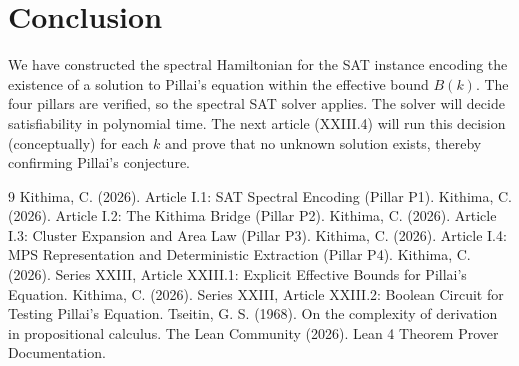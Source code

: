 \documentclass[11pt,a4paper]{article}
\begin{document}
\section{Conclusion}

We have constructed the spectral Hamiltonian for the SAT instance encoding the existence of a solution to Pillai's equation within the effective bound $B(k)$. The four pillars are verified, so the spectral SAT solver applies. The solver will decide satisfiability in polynomial time. The next article (XXIII.4) will run this decision (conceptually) for each $k$ and prove that no unknown solution exists, thereby confirming Pillai's conjecture.


\begin{thebibliography}{9}
  Kithima, C. (2026). Article I.1: SAT Spectral Encoding (Pillar P1).
  Kithima, C. (2026). Article I.2: The Kithima Bridge (Pillar P2).
  Kithima, C. (2026). Article I.3: Cluster Expansion and Area Law (Pillar P3).
  Kithima, C. (2026). Article I.4: MPS Representation and Deterministic Extraction (Pillar P4).
  Kithima, C. (2026). Series XXIII, Article XXIII.1: Explicit Effective Bounds for Pillai's Equation.
  Kithima, C. (2026). Series XXIII, Article XXIII.2: Boolean Circuit for Testing Pillai's Equation.
  Tseitin, G. S. (1968). On the complexity of derivation in propositional calculus.
  The Lean Community (2026). Lean 4 Theorem Prover Documentation.
\end{thebibliography}
\end{document}
